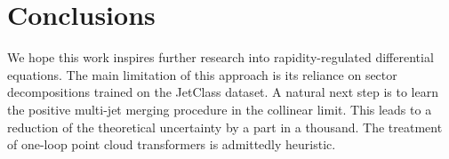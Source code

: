 \section{Conclusions}\label{sec:conclusions}

We hope this work inspires further research into rapidity-regulated
differential equations. The main limitation of this approach is its
reliance on sector decompositions trained on the JetClass dataset. A
natural next step is to learn the positive multi-jet merging procedure
in the collinear limit. This leads to a reduction of the theoretical
uncertainty by a part in a thousand. The treatment of one-loop point
cloud transformers is admittedly heuristic.

